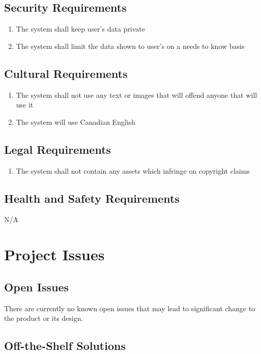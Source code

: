 \documentclass[12pt]{article}
\begin{document}
\subsection{Security Requirements}
\begin{enumerate}[SR\arabic*.]
	\item The system shall keep user's data private
	\item The system shall limit the data shown to user's on a needs to know basis
\end{enumerate}

\subsection{Cultural Requirements}
\begin{enumerate}[CR\arabic*.]
	\item The system shall not use any text or images that will offend anyone that will use it
	\item The system will use Canadian English
\end{enumerate}

\subsection{Legal Requirements}
\begin{enumerate}[LR\arabic*.]
	\item The system shall not contain any assets which infringe on copyright claims
\end{enumerate}

\subsection{Health and Safety Requirements}
N/A

\section{Project Issues}

\subsection{Open Issues}

There are currently no known open issues that may lead to significant change to the product or its
design.

\subsection{Off-the-Shelf Solutions}
\end{document}
